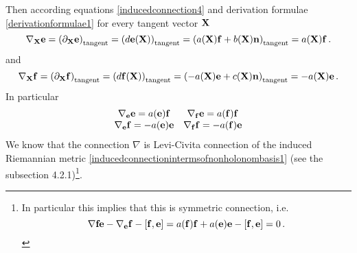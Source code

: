 \documentclass[12pt]{article}
\theoremstyle{theorem}
\numberwithin{equation}{section}
\begin{document}
{    Then according equations \eqref{inducedconnection4} and derivation formulae \eqref{derivationformulae1}
    for every tangent vector ${\bf X}$
        \begin{equation}\label{inducedconnectionintermsofnonholonombasis1}
        \nabla_{\bf X} {\bf e}=\left(\partial_{\bf X}{\bf e}\right)_{\rm tangent}=\left(d{\bf e}({\bf X})\right)_{\rm tangent}=
        \left(a({\bf X}){\bf f}+b({\bf X}){\bf n}\right)_{\rm tangent}=a({\bf X}){\bf f}\,.
        \end{equation}
and
    \begin{equation}\label{inducedconnectionintermsofnonholonombasis2}
        \nabla_{\bf X} {\bf f}=\left(\partial_{\bf X}{\bf f}\right)_{\rm tangent}=\left(d{\bf f}({\bf X})\right)_{\rm tangent}=
        \left(-a({\bf X}){\bf e}+c({\bf X}){\bf n}\right)_{\rm tangent}=-a({\bf X}){\bf e}\,.
        \end{equation}
 In particular
              \begin{equation}\label{inducedconnectionintermsofnonholonombasis3}
              \begin{matrix}
        \nabla_{\bf e} {\bf e}=a({\bf e}){\bf f}  &   \nabla_{\bf f} {\bf e}=a({\bf f}){\bf f}\cr
        \nabla_{\bf e} {\bf f}=-a({\bf e}){\bf e}  &   \nabla_{\bf f} {\bf f}=-a({\bf f}){\bf e}\cr
        \end{matrix}
        \end{equation}
We know that the connection $\nabla$ is Levi-Civita connection of the induced Riemannian metric
\eqref{inducedconnectionintermsofnonholonombasis1} (see the subsection 4.2.1)\footnote{In
particular this implies that this is symmetric connection, i.e.
\begin{equation}\label{commutatorofvectorfields}
    \nabla{\bf f}{\bf e}-\nabla_{\bf e}{\bf f}-[{\bf f},{\bf e}]=a({\bf f}){\bf f}+a({\bf e}){\bf e}-[{\bf f},{\bf e}]=0\,.
\end{equation}
}.

}
\end{document}
